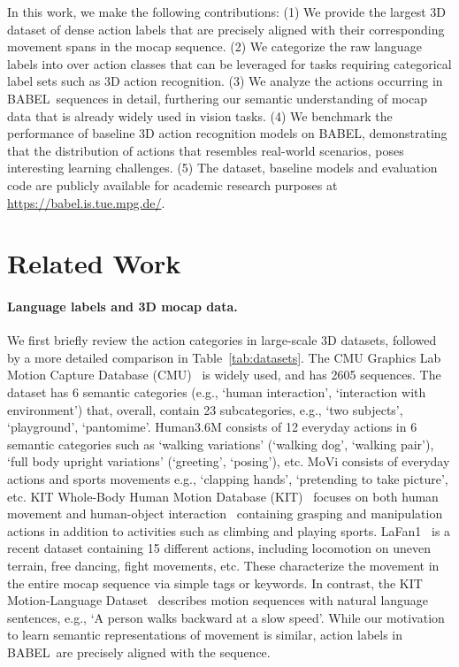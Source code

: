 \documentclass[final]{cvpr}
\def\babel{BABEL}
\begin{document}
In this work, we make the following contributions:
(1) We provide the largest 3D dataset of dense action labels that are precisely aligned with their corresponding movement spans in the mocap sequence. 
(2) We categorize the raw language labels into over  action classes that can be leveraged for tasks requiring categorical label sets such as 3D action recognition. 
(3) We analyze the actions occurring in \babel~sequences in detail, furthering our semantic understanding of mocap data that is already widely used in vision tasks. 
(4) We benchmark the performance of baseline 3D action recognition models on \babel, demonstrating that the distribution of actions that resembles real-world scenarios, poses interesting learning challenges. 
(5) The dataset, baseline models and evaluation code are publicly available for academic research purposes at \url{https://babel.is.tue.mpg.de/}. \section{Related Work}
\label{sec:related_work}


\noindent
\paragraph{Language labels and 3D mocap data.} 
We first briefly review the action categories in large-scale 3D datasets, followed by a more detailed comparison in Table~\ref{tab:datasets}. 
The CMU Graphics Lab Motion Capture Database (CMU)~\cite{cmu_mocap} is widely used, and has 2605 sequences. The dataset has 6 semantic categories (e.g., `human interaction', `interaction with environment') that, overall, contain 23 subcategories, e.g., `two subjects', `playground', `pantomime'. 
Human3.6M \cite{h36m_pami} consists of 12 everyday actions in 6 semantic categories such as `walking variations' (`walking dog', `walking pair'), `full body upright variations' (`greeting', `posing'), etc. 
MoVi \cite{ghorbani2020movi} consists of everyday actions and sports movements e.g., `clapping hands', `pretending to take picture', etc. 
KIT Whole-Body Human Motion Database (KIT)~\cite{DBLP:conf/icar/ManderyTDVA15} focuses on both human movement and human-object interaction~\cite{DBLP:conf/eccv/TaheriGBT20}
containing grasping and manipulation actions in addition to activities such as climbing and playing sports. 
LaFan1~\cite{harvey2020robust} is a recent dataset containing 15 different actions, including locomotion on uneven terrain, free dancing, fight movements, etc. 
These characterize the movement in the entire mocap sequence via simple tags or keywords. 
In contrast, the KIT Motion-Language Dataset~\cite{DBLP:conf/icar/ManderyTDVA15} describes motion sequences with natural language sentences, e.g., `A person walks backward at a slow speed'. 
While our motivation to learn semantic representations of movement is similar, action labels in \babel~are precisely aligned with the sequence. 
\end{document}
